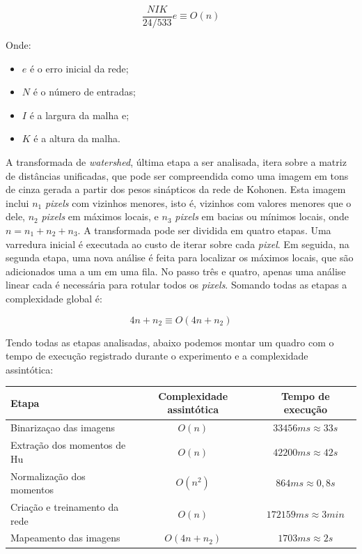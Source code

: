 \begin{equation}\label{eq:kohonen_trei}
\frac{NIK}{24/533}e \equiv O(n)
\end{equation}

Onde:

\begin{itemize}
\item $ e $ é o erro inicial da rede;
\item $ N $ é o número de entradas;
\item $ I $ é a largura da malha e;
\item $ K $ é a altura da malha.
\end{itemize}

A transformada de \textit{watershed}, última etapa a ser analisada, itera sobre a matriz
de distâncias unificadas, que pode ser compreendida como uma imagem em tons de
cinza gerada a partir dos pesos sinápticos da rede de Kohonen. Esta imagem
inclui $ n_1 $ \textit{pixels} com vizinhos menores, isto é, vizinhos com valores menores que
o dele, $ n_2 $ \textit{pixels} em máximos locais, e $ n_3 $ \textit{pixels} em bacias
ou mínimos locais,
onde $ n = n_1 + n_2 + n_3 $. A transformada pode ser dividida em quatro etapas. Uma
varredura inicial é executada ao custo de iterar sobre cada \textit{pixel}. Em seguida,
na segunda etapa, uma nova análise é feita para localizar os máximos locais,
que são adicionados uma a um em uma fila. No passo três e quatro, apenas uma análise
linear cada é necessária para rotular todos os \textit{pixels}. Somando todas as etapas
a complexidade global é:

\begin{equation}\label{eq:watershed_val}
4n + n_2 \equiv O(4n + n_2)
\end{equation}

Tendo todas as etapas analisadas, abaixo podemos montar um quadro com o tempo
de execução registrado durante o experimento e a complexidade assintótica:

\begin{center}
  \begin{tabular}{|l|c|c|}
    \hline\hline
    \textbf{Etapa} & \textbf{Complexidade assintótica} & \textbf{Tempo de execução} \\
    \hline\hline
    Binarizaçao das imagens & $ O(n) $ & $ 33456ms \approx 33s $ \\
    \hline
    Extração dos momentos de Hu & $ O(n) $ & $ 42200ms \approx 42s $ \\
    \hline
    Normalização dos momentos & $ O(n^2) $ & $ 864ms \approx 0,8s $ \\
    \hline
    Criação e treinamento da rede & $ O(n) $ & $ 172159ms \approx 3min  $ \\
    \hline
    Mapeamento das imagens & $ O(4n + n_2) $ & $ 1703ms \approx 2s $ \\
    \hline
  \end{tabular}
\end{center}
